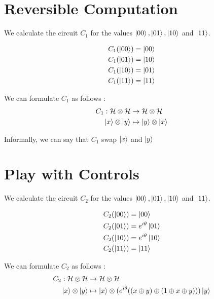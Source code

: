 \documentclass{article}
\theoremstyle{plain}
\begin{document}
  \section{Reversible Computation}

    We calculate the circuit $C_1$ for the values $\ket{00}, \ket{01}, \ket{10}$
    and $\ket{11}$.

    \begin{align*}
      C_1 (\ket{00}) &= \ket{00} \\
      C_1 (\ket{01}) &= \ket{10} \\
      C_1 (\ket{10}) &= \ket{01} \\
      C_1 (\ket{11}) &= \ket{11}
    \end{align*}

    We can formulate $C_1$ as follows :
    \begin{align*}
      C_1 : \mathcal H \otimes \mathcal H &\to \mathcal H \otimes \mathcal H \\
      \ket{x} \otimes \ket{y} &\mapstochar\to \ket y \otimes \ket x
    \end{align*}

    Informally, we can say that $C_1$ swap $\ket x$ and $\ket y$

  \section{Play with Controls}

    We calculate the circuit $C_2$ for the values $\ket{00}, \ket{01}, \ket{10}$
    and $\ket{11}$.

    \begin{align*}
      C_2 (\ket{00}) &= \ket{00} \\
      C_2 (\ket{01}) &= e^{i\theta} \ket{01} \\
      C_2 (\ket{10}) &= e^{i\theta} \ket{10} \\
      C_2 (\ket{11}) &= \ket{11}
    \end{align*}

    We can formulate $C_2$ as follows :
    \begin{align*}
      C_2 : \mathcal H \otimes \mathcal H &\to \mathcal H \otimes \mathcal H \\
      \ket{x} \otimes \ket{y} &\mapstochar\to \ket x \otimes
      (e^{i\theta}((x \oplus y) \oplus (1 \oplus x \oplus y))) \ket y
    \end{align*}

  \newpage
\end{document}
